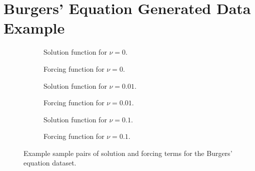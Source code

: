 \section{Burgers' Equation Generated Data Example}
\begin{figure}[H]
  \centering
  \begin{subfigure}{0.49\linewidth}
    \begin{adjustbox}{width=\linewidth}
      
    \end{adjustbox}
    \caption{Solution function for \(\nu=0\).}\label{fig:burgers_solution_0.0}
  \end{subfigure}
  \begin{subfigure}{0.49\linewidth}
    \begin{adjustbox}{width=\linewidth}
      
    \end{adjustbox}
    \caption{Forcing function for \(\nu=0\).}\label{fig:burgers_forcing_0.0}
  \end{subfigure}
  \begin{subfigure}{0.49\linewidth}
    \begin{adjustbox}{width=\linewidth}
      
    \end{adjustbox}
    \caption{Solution function for \(\nu=0.01\).}\label{fig:burgers_solution_0.01}
  \end{subfigure}
  \begin{subfigure}{0.49\linewidth}
    \begin{adjustbox}{width=\linewidth}
      
    \end{adjustbox}
    \caption{Forcing function for \(\nu=0.01\).}\label{fig:burgers_forcing_0.01}
  \end{subfigure}
  \begin{subfigure}{0.49\linewidth}
    \begin{adjustbox}{width=\linewidth}
      
    \end{adjustbox}
    \caption{Solution function for \(\nu=0.1\).}\label{fig:burgers_solution_0.1}
  \end{subfigure}
  \begin{subfigure}{0.49\linewidth}
    \begin{adjustbox}{width=\linewidth}
      
    \end{adjustbox}
    \caption{Forcing function for \(\nu=0.1\).}\label{fig:burgers_forcing_0.1}
  \end{subfigure}
  \caption{Example sample pairs of solution and forcing terms for the Burgers' equation dataset.}\label{fig:burgers_data}
\end{figure}

